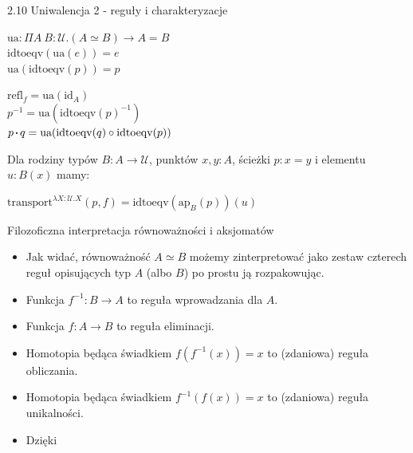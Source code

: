 \documentclass{beamer}
\newcommand{\U}{\mathcal{U}}
\newcommand{\refl}[1]{\text{refl}_{#1}}
\newcommand*\sq{\mathbin{\vcenter{\hbox{\rule{.3ex}{.3ex}}}}}
\newcommand{\ap}[2]{\text{ap}_{#1}(#2)}
\newcommand{\id}{\text{id}}
\newcommand{\comp}{\circ}
\newcommand{\transport}{\text{transport}}
\newcommand{\idtoeqv}{\text{idtoeqv}}
\newcommand{\ua}{\text{ua}}
\begin{document}
\begin{frame}{2.10 Uniwalencja 2 - reguły i charakteryzacje}

\begin{corollary}
$\ua : \Pi A\ B : \U. (A \simeq B) \to A = B$ \\

$\idtoeqv(\ua(e)) = e$ \\

$\ua(\idtoeqv(p)) = p$
\end{corollary}

\begin{theorem}
$\refl{f} = \ua(\id_A)$ \\

$p^{-1} = \ua(\idtoeqv(p)^{-1})$ \\

$p \sq q = \ua(\idtoeqv(q) \comp \idtoeqv(p))$
\end{theorem}

Dla rodziny typów $B : A \to \U$, punktów $x, y : A$, ścieżki $p : x = y$ i elementu $u : B(x)$ mamy:

\begin{theorem}
$\transport^{\lambda X : \U.X}(p, f) = \idtoeqv(\ap{B}{p})(u)$
\end{theorem}

\end{frame}

\begin{frame}{Filozoficzna interpretacja równoważności i aksjomatów}
\begin{itemize}
	\item Jak widać, równoważność $A \simeq B$ możemy zinterpretować jako zestaw czterech reguł opisujących typ $A$ (albo $B$) po prostu ją rozpakowując.
	\item Funkcja $f^{-1} : B \to A$ to reguła wprowadzania dla $A$.
	\item Funkcja $f : A \to B$ to reguła eliminacji.
	\item Homotopia będąca świadkiem $f(f^{-1}(x)) = x$ to (zdaniowa) reguła obliczania.
	\item Homotopia będąca świadkiem $f^{-1}(f(x)) = x$ to (zdaniowa) reguła unikalności.
	\item Dzięki 
\end{itemize}
\end{frame}
\end{document}
